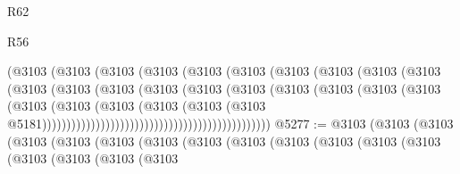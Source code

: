 \begin{lexlean}{R62}
\begin{lexlean}{R56}
\begin{coremodule}
{{{{{{{{{{{{{{{{{{{{{{{{{{{{{{{{{{{{{{{{{{{{{{{{{{{{{{{{{{{{{{{{{{{{{{{{{{{{{{{{{{{{{{{{{{{{{{{{{{{{{{{{{{{{{{{{{{{{{{{{{{{{{{{{{{{{{{{{{{{{{{{{{{{{{{{{{{{{{{{{{{{{{{{{{{{{{{{{{{{{{{{{{{{{{{{{{{{{{{{{{{{{{{{{{{{                                              (@3103
                                                (@3103
                                                  (@3103
                                                    (@3103
                                                      (@3103
                                                        (@3103
                                                          (@3103
                                                            (@3103
                                                              (@3103
                                                                (@3103
                                                                  (@3103
                                                                    (@3103
                                                                      (@3103
                                                                        (@3103
                                                                          (@3103
                                                                            (@3103
                                                                              (@3103
                                                                                (@3103
                                                                                  (@3103
                                                                                    (@3103
                                                                                      (@3103
                                                                                        (@3103
                                                                                          (@3103
                                                                                            (@3103
                                                                                              (@3103
                                                                                                (@3103
                                                                                                  @5181)))))))))))))))))))))))))))))))))))))))))))))))
@5277 := @3103
    (@3103
      (@3103
        (@3103
          (@3103
            (@3103
              (@3103
                (@3103
                  (@3103
                    (@3103
                      (@3103
                        (@3103
                          (@3103
                            (@3103
                              (@3103
                                (@3103
                                  (@3103
}}}}}}}}}}}}}}}}}}}}}}}}}}}}}}}}}}}}}}}}}}}}}}}}}}}}}}}}}}}}}}}}}}}}}}}}}}}}}}}}}}}}}}}}}}}}}}}}}}}}}}}}}}}}}}}}}}}}}}}}}}}}}}}}}}}}}}}}}}}}}}}}}}}}}}}}}}}}}}}}}}}}}}}}}}}}}}}}}}}}}}}}}}}}}}}}}}}}}}}}}}}}}}}}}}}
\end{coremodule}
\end{lexlean}
\end{lexlean}
